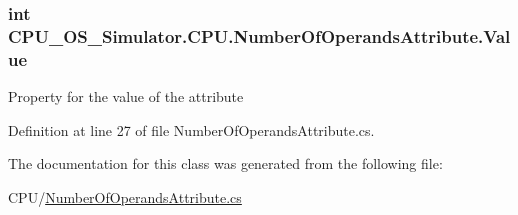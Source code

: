 \subsubsection[{Value}]{\setlength{\rightskip}{0pt plus 5cm}int C\+P\+U\+\_\+\+O\+S\+\_\+\+Simulator.\+C\+P\+U.\+Number\+Of\+Operands\+Attribute.\+Value\hspace{0.3cm}{\ttfamily [get]}}\label{class_c_p_u___o_s___simulator_1_1_c_p_u_1_1_number_of_operands_attribute_a00873634b211bcf2fd8b1425aa5143d6}


Property for the value of the attribute 



Definition at line 27 of file Number\+Of\+Operands\+Attribute.\+cs.



The documentation for this class was generated from the following file\+:\begin{DoxyCompactItemize}
\item 
C\+P\+U/\hyperlink{_number_of_operands_attribute_8cs}{Number\+Of\+Operands\+Attribute.\+cs}\end{DoxyCompactItemize}
